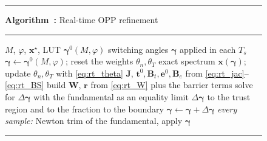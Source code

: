 \documentclass[conference]{IEEEtran}
\newcommand{\gv}{\boldsymbol{\gamma}}
\begin{document}
\begin{figure}[!t]
    \label{alg:rtopp}
    \hrule\smallskip
    \noindent\textbf{Algorithm~\thealgcount:} Real-time OPP refinement
    \smallskip\hrule\smallskip
    \footnotesize
    \begin{algorithmic}[1]
        \REQUIRE $M$, $\varphi$, $\mathbf{x}^\star$, LUT $\gv^0(M,\varphi)$
        \ENSURE switching angles $\gv$ applied in each $T_s$
        \LOOP
                \STATE $\gv \leftarrow \gv^0(M,\varphi)$; reset the weights
                       $\theta_n,\theta_T$
            \ENDIF
            \STATE exact spectrum $\mathbf{x}(\gv)$; update
                   $\theta_n,\theta_T$ with \eqref{eq:rt_theta}
            \STATE $\mathbf{J}$, $\mathbf{t}^0,\mathbf{B}_t,\mathbf{e}^0,
                   \mathbf{B}_e$ from \eqref{eq:rt_jac}--\eqref{eq:rt_BS}
            \STATE build $\mathbf{W}$, $\mathbf{r}$ from \eqref{eq:rt_W}
                   plus the barrier terms
            \STATE solve for $\Delta\gv$ with the fundamental as an equality
            \STATE limit $\Delta\gv$ to the trust region and to the
                   fraction to the boundary
            \STATE $\gv \leftarrow \gv+\Delta\gv$
            \STATE \textit{every sample:} Newton trim of the fundamental,
                   apply $\gv$
        \ENDLOOP
    \end{algorithmic}
    \smallskip\hrule
\end{figure}
\end{document}
